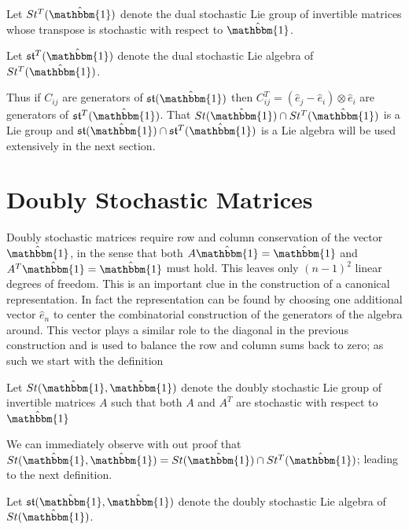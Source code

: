 \begin{definition}
	Let $St^T(\hat{\mathbbm{1}})$ denote the dual stochastic Lie group of 
	invertible matrices whose transpose is stochastic with respect to $\hat{\mathbbm{1}}$.
\end{definition}

\begin{definition}
	Let $\mathfrak{st}^T(\hat{\mathbbm{1}})$ denote the dual stochastic Lie 
	algebra of $St^T(\hat{\mathbbm{1}})$.
\end{definition}

Thus if $C_{ij}$ are generators of $\mathfrak{st}(\hat{\mathbbm{1}})$ then $C_{ij}^T = \left(\hat{e}_j - \hat{e}_i \right) \otimes \hat{e}_i$
are generators of $\mathfrak{st}^T(\hat{\mathbbm{1}})$. That $St(\hat{\mathbbm{1}}) \cap St^T(\hat{\mathbbm{1}})$ 
is a Lie group and $\mathfrak{st}(\hat{\mathbbm{1}}) \cap \mathfrak{st}^T(\hat{\mathbbm{1}})$ 
is a Lie algebra will be used extensively in the next section.

\section{Doubly Stochastic Matrices}
Doubly stochastic matrices require row and column conservation of the vector $\hat{\mathbbm{1}}$, 
in the sense that both $A \hat{\mathbbm{1}} = \hat{\mathbbm{1}}$ and $A^T \hat{\mathbbm{1}} = \hat{\mathbbm{1}}$ 
must hold. This leaves only $\left(n - 1\right)^2$ linear degrees of freedom. 
This is an important clue in the construction of a canonical representation. In 
fact the representation can be found by choosing one additional vector $\hat{e}_n$ 
to center the combinatorial construction of the generators of the algebra 
around. This vector plays a similar role to the diagonal in the previous 
construction and is used to balance the row and column sums back to zero; as 
such we start with the definition

\begin{definition}
	Let $St(\hat{\mathbbm{1}}, \hat{\mathbbm{1}})$ denote the doubly stochastic 
	Lie group of invertible matrices $A$ such that both $A$ and $A^T$ are 
	stochastic with respect to $\hat{\mathbbm{1}}$
\end{definition}

We can immediately observe with out proof that $St(\hat{\mathbbm{1}}, \hat{\mathbbm{1}}) = St(\hat{\mathbbm{1}}) \cap St^T(\hat{\mathbbm{1}})$;
leading to the next definition.

\begin{definition}
	Let $\mathfrak{st}(\hat{\mathbbm{1}}, \hat{\mathbbm{1}})$ denote the doubly 
	stochastic Lie algebra of $St(\hat{\mathbbm{1}})$.
\end{definition}

